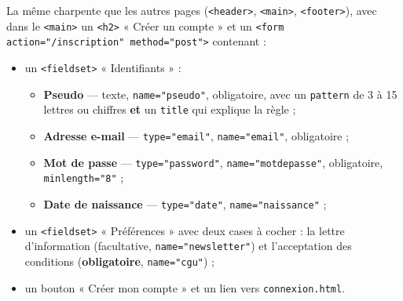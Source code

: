 \documentclass[a4paper,11pt]{article}
\begin{document}
\begin{center}
\end{center}

\begin{tcolorbox}[definition, title={À produire dans \texttt{inscription.html}}]
La même charpente que les autres pages (\texttt{<header>}, \texttt{<main>}, \texttt{<footer>}), avec dans le \texttt{<main>} un \texttt{<h2>} « Créer un compte » et un \texttt{<form action="/inscription" method="post">} contenant :
\begin{itemize}
  \item un \texttt{<fieldset>} « Identifiants » :
  \begin{itemize}
    \item \textbf{Pseudo} --- texte, \texttt{name="pseudo"}, obligatoire, avec un \texttt{pattern} de 3 à 15 lettres ou chiffres \textbf{et} un \texttt{title} qui explique la règle ;
    \item \textbf{Adresse e-mail} --- \texttt{type="email"}, \texttt{name="email"}, obligatoire ;
    \item \textbf{Mot de passe} --- \texttt{type="password"}, \texttt{name="motdepasse"}, obligatoire, \texttt{minlength="8"} ;
    \item \textbf{Date de naissance} --- \texttt{type="date"}, \texttt{name="naissance"} ;
  \end{itemize}
  \item un \texttt{<fieldset>} « Préférences » avec deux cases à cocher : la lettre d'information (facultative, \texttt{name="newsletter"}) et l'acceptation des conditions (\textbf{obligatoire}, \texttt{name="cgu"}) ;
  \item un bouton « Créer mon compte » et un lien vers \texttt{connexion.html}.
\end{itemize}
\end{tcolorbox}
\end{document}

